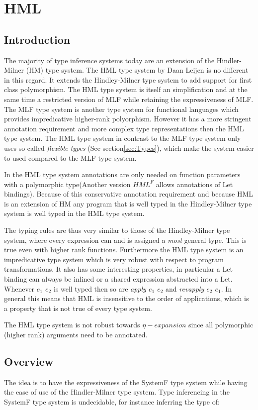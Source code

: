 \chapter{HML}
\label{HML}
\section{Introduction}
The majority of type inference systems today are an extension of the  Hindler-Milner (HM)\cite{HM} type system. The HML\cite{HML} type system by Daan Leijen is no different in this regard. It extends the Hindley-Milner type system to add support for first class polymorphism. The HML type system is itself an simplification and at the same time a restricted version of MLF\cite{MLF} while retaining the expressiveness of MLF. The MLF type system is another type system for functional languages which provides impredicative higher-rank polyorphism. However it has a more stringent annotation requirement and more complex type representations then the HML type system. The HML type system in contrast to the MLF type system only uses so called \emph{flexible types} (See section\ref{sec:Types}), which make the system easier to used compared to the  MLF type system.

In the HML type system annotations are only needed on function parameters with a polymorphic type(Another version $HML^F$ allows annotations of Let bindings). Because of this conservative annotation requirement and because HML is an extension of HM any program that is well typed in the Hindley-Milner type system is well typed in the HML type system.

The typing rules are thus very similar to those of the Hindley-Milner type system, where every expression can and is assigned a \emph{most} general type. This is true even with higher rank functions. Furthermore the HML type system is an impredicative type system which is very robust with respect to program transformations. It also has some interesting properties, in particular a Let binding can always be inlined or a shared expression abstracted into a Let. Whenever \emph{$e_1$ $e_2$} is well typed then so are \emph{apply $e_1$ $e_2$} and \emph{revapply $e_2$ $e_1$}. In general this means that HML is insensitive to the order of applications, which is a property that is not true of every type system.

The HML type system is not robust towards $\eta-expansion$ since all polymorphic (higher rank) arguments need to be annotated.

\section{Overview}
The idea is to have the expressiveness of the SystemF type system while having the ease of use of the Hindler-Milner type system. Type inferencing in the SystemF type system is undecidable, for instance inferring the type of:

